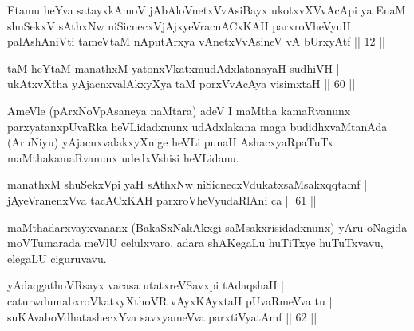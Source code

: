 \begin{shl}
Etamu heYva satayxkAmoV jAbAloV\s netxVvAsiBayx ukotxvXVvAcApi ya EnaM shuSekxV sAthxNw niSicnecxVjAjxyeVracnACxKAH parxroVheVyuH palAshAniVti tameVtaM nAputArxya vAnetxVvAsineV vA bUrxyAtf || 12 ||
\end{shl}


\begin{shl}
taM heYtaM manathxM yatonxVkatxmudAdxlatanayaH sudhiVH | \\
ukAtxvX\s tha yAjacnxvalAkxyXya taM porxVvAcAya visimxtaH \hfill|| 60 || 
\end{shl}

\begin{artha}
AmeVle (pArxNoVpAsaneya naMtara) adeV I maMtha kamaRvanunx 
parxyatanxpUvaRka heVLidadxnunx udAdxlakana maga budidhxvaMtanAda 
(AruNiyu) yAjacnxvalakxyXnige heVLi punaH AshacxyaRpaTuTx 
maMthakamaRvanunx udedxVshisi heVLidanu.
\end{artha}


\begin{shl}
manathxM shuSekxV\s pi yaH sAthxNw niSicnecxVdukatxsaMsakxqqtamf | \\
jAyeVranenxVva tacACxKAH parxroVheVyudaRlAni ca \hfill|| 61 || 
\end{shl}

\begin{artha}
maMthadarxvayxvananx (BakaSxNakAkxgi saMsakxrisidadxnunx) yAru oNagida 
moVTumarada meVlU celulxvaro, adara shAKegaLu huTiTxye huTuTxvavu, 
elegaLU ciguruvavu.
\end{artha}

\begin{shl}
yAdaqgathoVR\s sayx vacasa utatxreVSavxpi tAdaqshaH | \\
\footnotemark[1]caturwdumabxroVkatxyXthoVR vAyxKAyxtaH pUvaRmeVva tu | \\
\footnotemark[2]suKAvaboVdhatashecxYva savxyameVva parxtiVyatAmf \hfill|| 62 || 
\end{shl}

